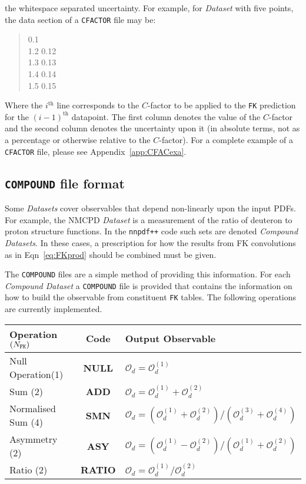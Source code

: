 \documentclass[11pt]{article}
\begin{document}
the whitespace separated uncertainty. For example, for \emph{Dataset} with five
points, the data section of a {\tt CFACTOR} file may be:
%
\begin{quotation}	0.1\\
 1.2	0.12\\
 1.3	0.13\\
 1.4	0.14\\
 1.5	0.15
\end{quotation}
Where the $i^{\text{th}}$ line corresponds to the $C$-factor to be applied to
the {\tt FK} prediction for the $(i-1)^{\text{th}}$ datapoint.  The first column
denotes the value of the $C$-factor and the second column denotes the
uncertainty upon it (in absolute terms, not as a percentage or otherwise
relative to the $C$-factor). For a complete example of a {\tt CFACTOR} file,
please see Appendix~\ref{app:CFACexa}.

\subsection{{\tt COMPOUND} file format}
Some \emph{Datasets} cover observables that depend non-linearly upon the input
PDFs. For example, the NMCPD \emph{Dataset} is a measurement of the ratio of
deuteron to proton structure functions. In the {\tt nnpdf++} code such sets are
denoted \emph{Compound Datasets}. In these cases, a prescription for how the
results from FK convolutions as in Eqn~\ref{eq:FKprod} should be combined must
be given.

The {\tt COMPOUND} files are a simple method of providing this information. For
each \emph{Compound Dataset} a {\tt COMPOUND} file is provided that contains the
information on how to build the observable from constituent {\tt FK} tables. The
following operations are currently implemented.
%
\begin{table}[htp]
\begin{center}
\begin{tabular}{|l|c|l|}
\hline
Operation $(N_{\text{\tt FK}})$ & Code & Output Observable\\
\hline\hline
Null Operation(1)& \textbf{NULL} &  $\mathcal{O}_d =  \mathcal{O}_d^{(1)}$ \\
Sum (2)& \textbf{ADD} &  $\mathcal{O}_d = \mathcal{O}^{(1)}_d + \mathcal{O}^{(2)}_d $\\
Normalised Sum (4)&  \textbf{SMN}  & $\mathcal{O}_d = (\mathcal{O}^{(1)}_d + \mathcal{O}^{(2)}_d)/(\mathcal{O}^{(3)}_d + \mathcal{O}^{(4)}_d) $ \\
Asymmetry (2)& \textbf{ASY} &  $\mathcal{O}_d = (\mathcal{O}^{(1)}_d - \mathcal{O}^{(2)}_d)/(\mathcal{O}^{(1)}_d + \mathcal{O}^{(2)}_d) $\\
Ratio (2)&  \textbf{RATIO} & $\mathcal{O}_d = \mathcal{O}^{(1)}_d / \mathcal{O}^{(2)}_d $\\
\hline
\end{tabular}
\end{center}
\label{default}
\end{table}%
\end{document}
